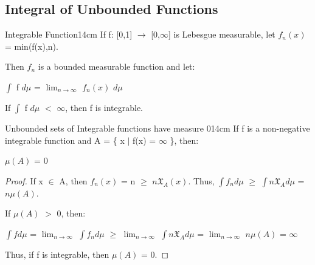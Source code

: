    \vspace{0.5cm}



    
\subsection{ Integral of Unbounded Functions }

    \begin{definition}{Integrable Function}{14cm}
        If f: [0,1] $\rightarrow$ [0,$\infty$] is Lebesgue measurable,
        let $f_n(x)$ = min(f(x),n).

        Then $f_n$ is a bounded measurable function and let:

        \hspace{0.5cm}
        $\int$ f $d\mu$ = $\lim_{n \rightarrow \infty}$ $f_n(x)$ $d\mu$

        If $\int$ f $d\mu$ $<$ $\infty$, then f is {\color{lblue} integrable}.
    \end{definition}

    \vspace{0.5cm}



    \begin{wtheorem}{Unbounded sets of Integrable functions have measure 0}{14cm}
        If f is a non-negative integrable function and
        A = \{ x $|$ f(x) = $\infty$ \}, then:
        
        \hspace{0.5cm}
        $\mu(A)$ = 0 
    \end{wtheorem}

    \begin{proof}
        If x $\in$ A, then $f_n(x)$ = n $\geq$ $n \mathfrak{X}_A(x)$.
        Thus, $\int f_n d\mu$ $\geq$ $\int n \mathfrak{X}_A d\mu$ = $n\mu(A)$.

        If $\mu(A)$ $>$ 0, then:

        \hspace{0.5cm}
        $\int f d\mu$
        = $\lim_{n \rightarrow \infty}$ $\int f_n d\mu$
        $\geq$ $\lim_{n \rightarrow \infty}$ $\int n \mathfrak{X}_A d\mu$
        = $\lim_{n \rightarrow \infty}$ $n\mu(A)$
        = $\infty$

        Thus, if f is integrable, then $\mu(A)$ = 0.
    \end{proof}

    \vspace{0.5cm}



